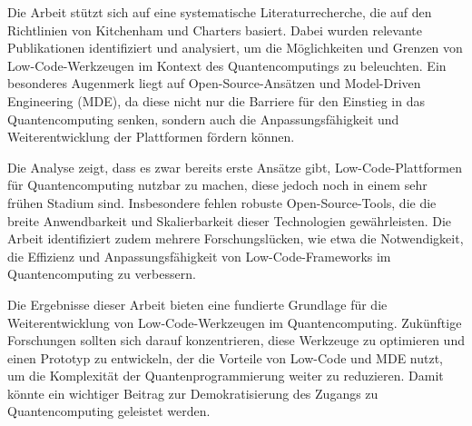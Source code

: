 Die Arbeit stützt sich auf eine systematische Literaturrecherche, die auf den Richtlinien von Kitchenham und Charters basiert. Dabei wurden 
relevante Publikationen identifiziert und analysiert, um die Möglichkeiten und Grenzen von Low-Code-Werkzeugen im Kontext des Quantencomputings 
zu beleuchten. Ein besonderes Augenmerk liegt auf Open-Source-Ansätzen und Model-Driven Engineering (MDE), da diese nicht nur die Barriere für 
den Einstieg in das Quantencomputing senken, sondern auch die Anpassungsfähigkeit und Weiterentwicklung der Plattformen fördern können.

Die Analyse zeigt, dass es zwar bereits erste Ansätze gibt, Low-Code-Plattformen für Quantencomputing nutzbar zu machen, diese jedoch noch in 
einem sehr frühen Stadium sind. Insbesondere fehlen robuste Open-Source-Tools, die die breite Anwendbarkeit und Skalierbarkeit dieser Technologien 
gewährleisten. Die Arbeit identifiziert zudem mehrere Forschungslücken, wie etwa die Notwendigkeit, die Effizienz und Anpassungsfähigkeit von 
Low-Code-Frameworks im Quantencomputing zu verbessern.

Die Ergebnisse dieser Arbeit bieten eine fundierte Grundlage für die Weiterentwicklung von Low-Code-Werkzeugen im Quantencomputing. Zukünftige 
Forschungen sollten sich darauf konzentrieren, diese Werkzeuge zu optimieren und einen Prototyp zu entwickeln, der die Vorteile von Low-Code 
und MDE nutzt, um die Komplexität der Quantenprogrammierung weiter zu reduzieren. Damit könnte ein wichtiger Beitrag zur Demokratisierung des 
Zugangs zu Quantencomputing geleistet werden.

% 


